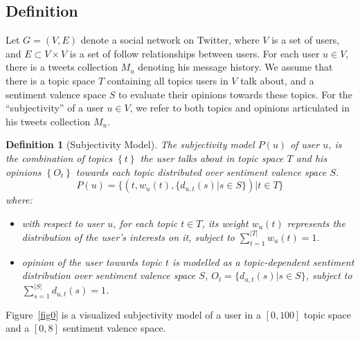 \documentclass[letterpaper]{article}
\newtheorem{definition}{Definition}
\begin{document}
\subsection{Definition}
\label{definition}

Let $G=\left( V,E \right) $ denote a social network on Twitter, where $ V $ is a set of users, and $ E\subset V\times V $ is a set of follow relationships between users. For each user $ u \in V $, there is a tweets collection $ M_{u} $ denoting his message history. We assume that there is a topic space $ T $ containing all topics users in $ V $ talk about, and a sentiment valence space $ S $ to evaluate their opinions towards these topics. 
For the ``subjectivity'' of a user $ u  \in V $, we refer to both topics and opinions articulated in his tweets collection $ M_{u} $.  
\begin{definition}[Subjectivity Model]
The subjectivity model $ P \left( u \right) $ of user $ u $, is the combination of topics $\left\lbrace  t \right\rbrace $ the user talks about in topic space $T$ and his opinions $\left\lbrace O_{t}\right\rbrace $ towards each topic distributed over sentiment valence space $ S $. 
\begin{equation}
\label{usermodel}
P \left( u \right) = \lbrace \left( t, w_{u} \left( t \right), \lbrace d_{u,t} \left( s \right)|s \in S \rbrace \right) |  t \in T \rbrace
\end{equation}
where:
\begin{itemize}
\item with respect to user $ u $, for each topic $t \in T$, its weight $ w_{u} \left( t \right)$ represents the distribution of the user's interests on it, subject to $ \sum_{t=1}^{|T|}w_{u} \left( t \right)=1 $.
\item opinion of the user towards topic $t$ is modelled as a topic-dependent sentiment distribution over sentiment valence space $ S $, $O_{t}=\lbrace d_{u,t} \left( s \right)|s \in S \rbrace $, subject to $ \sum_{s=1}^{|S|} d_{u,t} \left( s \right)=1$.
\end{itemize}
\end{definition}
Figure~\ref{fig0} is a visualized subjectivity model of a user in a $ [0,100] $ topic space and a $ [0,8] $ sentiment valence space. 
\end{document}
